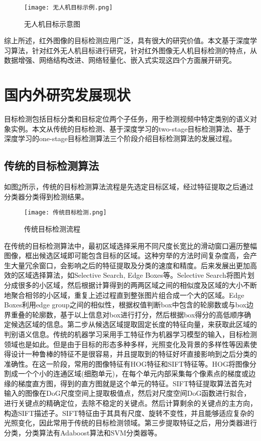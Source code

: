 \begin{figure}[htbp]
    \centering
    \texttt{[image: 无人机目标示例.png]}
    \caption{无人机目标示意图}
    \label{uav}
\end{figure}

综上所述，红外图像的目标检测应用广泛，具有很大的研究价值。本文基于深度学习算法，针对红外无人机目标进行研究，针对红外图像无人机目标检测的特点，从数据增强、网络结构改进、网络轻量化、嵌入式实现这四个方面展开研究。

\section{国内外研究发展现状}
目标检测包括目标分类和目标定位两个子任务，用于检测视频中特定类别的语义对象实例。本文从传统的目标检测、基于深度学习的two-stage目标检测算法、基于深度学习的one-stage目标检测算法三个阶段介绍目标检测算法的发展过程\cite{尹宏鹏2016基于视觉的目标检测与跟踪综述}。

\subsection{传统的目标检测算法}
如图\ref{ct}所示，传统的目标检测算法流程是先选定目标区域，经过特征提取之后通过分类器分类得到检测结果。

\begin{figure}[htbp]
    \centering
    \texttt{[image: 传统目标检测.png]}
    \caption{传统目标检测流程}
    \label{ct}
\end{figure}

在传统的目标检测算法中，最初区域选择采用不同尺度长宽比的滑动窗口遍历整幅图像，框出候选区域即可能包含目标的区域\cite{胡伏原2020基于卷积神经网络的目标检测算法综述,kira1992feature}。这种穷举的方法时间复杂度高，会产生大量冗余窗口，会影响之后的特征提取及分类的速度和精度。后来发展出更加高效的区域选择算法，如Selective Search\cite{uijlings2013selective},  Edge Boxes\cite{zitnick2014edge}等。Selective Search将图片划分成很多的小区域，然后根据计算得到的两两区域之间的相似度及区域的大小不断地聚合相邻的小区域，重复上述过程直到整张图片组合成一个大的区域。Edge Boxes利用edge group之间的相似性，根据权值判断box中包含的轮廓数或与box边界重叠的轮廓数，基于以上信息对box进行打分，然后根据box得分的高低顺序确定候选区域的信息。第二步从候选区域提取固定长度的特征向量，来获取此区域的判别语义信息。传统的机器学习采用手工特征作为机器学习模型的输入，目标检测领域也是如此。但是由于目标的形态多种多样，光照变化及背景的多样性等因素使得设计一种鲁棒的特征不是很容易，并且提取到的特征好坏直接影响到之后分类的准确性。在这一阶段，常用的图像特征有HOG特征\cite{he1990texture}和SIFT特征\cite{lowe1999object}等。HOG将图像分割成一个个小的连通区域(细胞单元)，在每个单元内部采集每个像素点的梯度或边缘的梯度直方图，得到的直方图就是这个单元的特征。SIFT特征提取算法首先对输入的图像在DoG尺度空间上提取极值点，然后对尺度空间DoG函数进行拟合，进行关键点的精确定位，去除不稳定的关键点。然后计算剩余的关键点的主方向，构造SIFT描述子。SIFT特征由于其具有尺度、旋转不变性，并且能够适应复杂的光照变化，因此常用于传统的目标检测领域。第三步提取特征之后，用分类器进行分类，分类算法有Adaboost算法\cite{freund1997decision}和SVM分类器\cite{cortes1995support}等。


